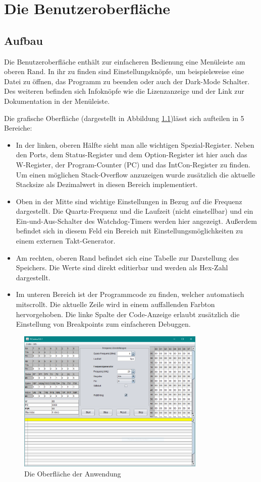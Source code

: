 \chapter{Die Benutzeroberfläche}
\section{Aufbau}
Die Benutzeroberfläche enthält zur einfacheren Bedienung eine Menüleiste am oberen Rand. In ihr zu finden sind Einstellungsknöpfe, um beispielsweise eine Datei zu öffnen, das Programm zu beenden oder auch der Dark-Mode Schalter. Des weiteren befinden sich Infoknöpfe wie die Lizenzanzeige und der Link zur Dokumentation in der Menüleiste. 

\noindent Die grafische Oberfläche (dargestellt in Abbildung \ref{gui})lässt sich aufteilen in 5 Bereiche: 
\begin{itemize}
\item In der linken, oberen Hälfte sieht man alle wichtigen Spezial-Register. Neben den Ports, dem Status-Register und dem Option-Register ist hier auch das W-Register, der Program-Counter (PC) und das IntCon-Register zu finden. Um einen möglichen Stack-Overflow anzuzeigen wurde zusätzlich die aktuelle Stacksize als Dezimalwert in diesen Bereich implementiert. 
\item Oben in der Mitte sind wichtige Einstellungen in Bezug auf die Frequenz dargestellt. Die Quartz-Frequenz und die Laufzeit (nicht einstellbar) und ein Ein-und-Aus-Schalter des Watchdog-Timers werden hier angezeigt. Außerdem befindet sich in diesem Feld ein Bereich mit Einstellungsmöglichkeiten zu einem externen Takt-Generator. 
\item Am rechten, oberen Rand befindet sich eine Tabelle zur Darstellung des Speichers. Die Werte sind direkt editierbar und werden als Hex-Zahl dargestellt. 
\item Im unteren Bereich ist der Programmcode zu finden, welcher automatisch mitscrollt. Die aktuelle Zeile wird in einem auffallenden Farbton hervorgehoben. Die linke Spalte der Code-Anzeige erlaubt zusätzlich die Einstellung von Breakpoints zum einfacheren Debuggen. 
\end{itemize}
\begin{figure}[ht]
	\centering
	\includegraphics[width=0.8\textwidth]{img/gui}
	\caption{Die Oberfläche der Anwendung}
	\label{gui}
\end{figure}
